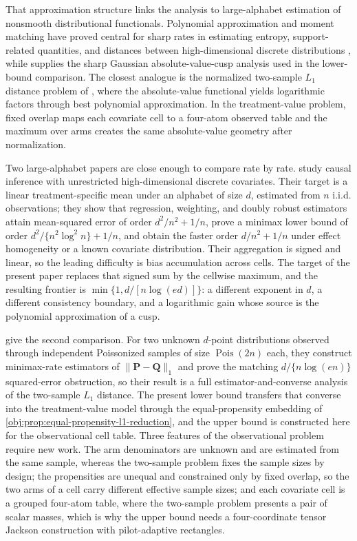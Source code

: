 \documentclass[11pt]{article}
\begin{document}
That approximation structure links the analysis to large-alphabet estimation of nonsmooth distributional functionals. Polynomial approximation and moment matching have proved central for sharp rates in estimating entropy, support-related quantities, and distances between high-dimensional discrete distributions \citep{JiaoVenkatHanWeissman2015Functionals,Wu2016,HanJiaoWeissman2018Local,Valiant2017}, while \citet{CaiLow2011L1} supplies the sharp Gaussian absolute-value-cusp analysis used in the lower-bound comparison. The closest analogue is the normalized two-sample \(L_1\) distance problem of \citet{JiaoHanWeissman2018L1}, where the absolute-value functional yields logarithmic factors through best polynomial approximation. In the treatment-value problem, fixed overlap maps each covariate cell to a four-atom observed table and the maximum over arms creates the same absolute-value geometry after normalization.

Two large-alphabet papers are close enough to compare rate by rate. \citet{ZengBalakrishnanHanKennedy2024Discrete} study causal inference with unrestricted high-dimensional discrete covariates. Their target is a linear treatment-specific mean under an alphabet of size \(d\), estimated from \(n\) i.i.d. observations; they show that regression, weighting, and doubly robust estimators attain mean-squared error of order \(d^{2}/n^{2}+1/n\), prove a minimax lower bound of order \(d^{2}/\{n^{2}\log^{2}n\}+1/n\), and obtain the faster order \(d/n^{2}+1/n\) under effect homogeneity or a known covariate distribution. Their aggregation is signed and linear, so the leading difficulty is bias accumulation across cells. The target of the present paper replaces that signed sum by the cellwise maximum, and the resulting frontier is \(\min\{1,d/[n\log(ed)]\}\): a different exponent in \(d\), a different consistency boundary, and a logarithmic gain whose source is the polynomial approximation of a cusp.

\citet{JiaoHanWeissman2018L1} give the second comparison. For two unknown \(d\)-point distributions observed through independent Poissonized samples of size \(\operatorname{Pois}(2n)\) each, they construct minimax-rate estimators of \(\|\mathbf P-\mathbf Q\|_1\) and prove the matching \(d/\{n\log(en)\}\) squared-error obstruction, so their result is a full estimator-and-converse analysis of the two-sample \(L_1\) distance. The present lower bound transfers that converse into the treatment-value model through the equal-propensity embedding of \cref{obj:prop:equal-propensity-l1-reduction}, and the upper bound is constructed here for the observational cell table. Three features of the observational problem require new work. The arm denominators are unknown and are estimated from the same sample, whereas the two-sample problem fixes the sample sizes by design; the propensities are unequal and constrained only by fixed overlap, so the two arms of a cell carry different effective sample sizes; and each covariate cell is a grouped four-atom table, where the two-sample problem presents a pair of scalar masses, which is why the upper bound needs a four-coordinate tensor Jackson construction with pilot-adaptive rectangles.
\end{document}
